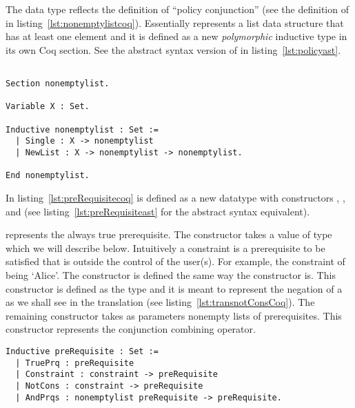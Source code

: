 The data type  reflects the definition of ``policy conjunction'' (see the definition of  in listing~\ref{lst:nonemptylistcoq}). Essentially  represents a list data structure that has at least one element and it is defined as a new \emph{polymorphic} inductive type in its own Coq section. See the abstract syntax version of  in listing~\ref{lst:policyast}.  


\begin{minipage}[c]{0.95\textwidth}
\begin{lstlisting}

Section nonemptylist.

Variable X : Set.

Inductive nonemptylist : Set :=
  | Single : X -> nonemptylist 
  | NewList : X -> nonemptylist -> nonemptylist.

End nonemptylist.
\end{lstlisting}
\end{minipage}


In listing~\ref{lst:preRequisitecoq}  is defined as a new datatype with constructors , ,  and  (see listing~\ref{lst:preRequisiteast} for the abstract syntax equivalent).

 represents the always true prerequisite. The  constructor takes a value of type  which we will describe below. Intuitively a constraint is a prerequisite to be satisfied that is outside the control of the user(s). For example, the constraint of being `Alice'. The constructor  is defined the same way the  constructor is. This constructor is defined as the type  and it is meant to represent the negation of a  as we shall see in the translation (see listing~\ref{lst:transnotConsCoq}). The remaining constructor  takes as parameters nonempty lists of prerequisites. This constructor represents the conjunction combining operator. 


\lstset{language=Coq}
\begin{lstlisting}[frame=single, caption={preRequisite},label={lst:preRequisitecoq}]
Inductive preRequisite : Set :=
  | TruePrq : preRequisite
  | Constraint : constraint -> preRequisite 
  | NotCons : constraint -> preRequisite 
  | AndPrqs : nonemptylist preRequisite -> preRequisite.
  
\end{lstlisting}

